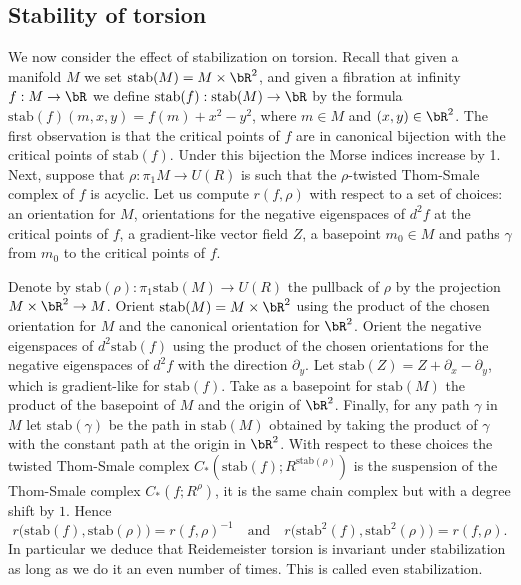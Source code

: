 \documentclass[JEP,XML,SOM,Unicode,NoFloatCountersInSection]{cedram}
\newcommand{\stab}{\mathrm{stab}}
\theoremstyle{plain}
\theoremstyle{definition}
\begin{document}
\subsection{Stability of torsion}\label{Section: stability of torsion}
We now consider the effect of stabilization on torsion. Recall that given a manifold $M$ we set $\stab (M)=M \times \bR^2$, and given a fibra\-tion at infinity $f: M \to \bR$ we define $\stab (f): \stab (M) \to \bR$ by the formula $\stab (f)(m,x,y)=f(m) + x^2 - y^2$, where $m\in M$ and $(x,y) \in \bR^2$. The first obser\-vation is that the critical points of $f$ are in canonical bijection with the critical points of $\stab (f)$. Under this bijection the Morse indices increase by 1. Next, suppose that $\rho: \pi_1M \to U(R)$ is such that the $\rho$-twisted Thom-Smale complex of $f$ is acyclic. Let us compute $r(f,\rho)$ with respect to a set of choices: an orientation for $M$, orientations for the negative eigenspaces of $d^2f$ at the critical points of $f$, a gradient-like vector field $Z$, a basepoint $m_0\in M$ and paths $\gamma$ from $m_0$ to the critical points of $f$.

Denote by $\stab (\rho) : \pi_1 \stab (M) \to U(R)$ the pullback of $\rho$ by the projection \hbox{$M \times \bR^2 \to M$}. Orient $\stab (M)=M \times \bR^2$ using the product of the chosen orientation for $M$ and the canonical orientation for $\bR^2$. Orient the negative eigenspaces of $d^2 \stab (f)$ using the product of the chosen orientations for the negative eigenspaces of $d^2f$ with the direction $\partial_y$. Let $\stab (Z) = Z + \partial_x - \partial_y$, which is gradient-like for $\stab (f)$. Take as a basepoint for $\stab (M)$ the product of the basepoint of $M$ and the origin of $\bR^2$. Finally, for any path $\gamma$ in $M$ let $\stab (\gamma)$ be the path in $\stab (M)$ obtained by taking the product of $\gamma$ with the constant path at the origin in $\bR^2$. With respect to these choices the twisted Thom-Smale complex $C_*(\stab (f); R^{\stab (\rho)} )$ is the suspension of the Thom-Smale complex $C_*(f; R^\rho)$, \ie it is the same chain complex but with a degree shift by $1$. Hence
\[ r\big( \stab (f), \stab (\rho)\big) = r(f, \rho)^{-1} \quad \text{and} \quad r\big( \stab ^2(f), \stab ^2(\rho)\big) = r(f, \rho).\]
In particular we deduce that Reidemeister torsion is invariant under stabilization as long as we do it an even number of times. This is called even stabilization.
\end{document}
